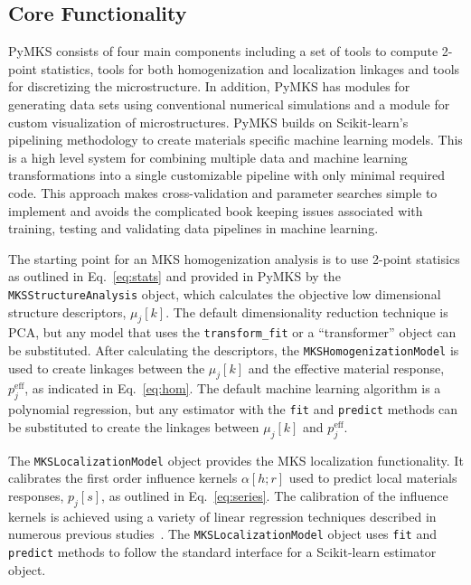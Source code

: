 \documentclass{bmcart}
\begin{document}
\subsection{Core Functionality}


PyMKS consists of four main components including a set of tools to
compute 2-point statistics, tools for both homogenization and
localization linkages and tools for discretizing the microstructure. In
addition, PyMKS has modules for generating data sets using
conventional numerical simulations and a module for custom
visualization of microstructures. PyMKS builds on Scikit-learn's
pipelining methodology to create materials specific machine learning
models. This is a high level system for combining
multiple data and machine learning transformations into a single
customizable pipeline with only minimal required code. This approach
makes cross-validation and parameter searches simple to implement and
avoids the complicated book keeping issues associated with training,
testing and validating data pipelines in machine learning.

The starting point for an MKS homogenization analysis is to use
2-point statisics as outlined in Eq.~\ref{eq:stats} and provided in
PyMKS by the \texttt{MKSStructureAnalysis} object, which calculates
the objective low dimensional structure descriptors, $\mu_j[k]$. The
default dimensionality reduction technique is PCA, but any model that
uses the \texttt{transform\_fit} or a ``transformer'' object can be
substituted. After calculating the descriptors, the
\texttt{MKSHomogenizationModel} is used to create linkages between the
$\mu_j[k]$ and the effective material response, $p_j^{\text{eff}}$, as
indicated in Eq.~\ref{eq:hom}. The default machine learning algorithm
is a polynomial regression, but any estimator with the \texttt{fit}
and \texttt{predict} methods can be substituted to create the linkages
between $\mu_j[k]$ and $p_j^{\text{eff}}$.

The \texttt{MKSLocalizationModel} object provides the MKS localization
functionality. It calibrates the first order influence kernels
$\alpha[h; r]$ used to predict local materials responses, $p_j[s]$, as
outlined in Eq.~\ref{eq:series}. The calibration of the influence
kernels is achieved using a variety of linear regression techniques
described in numerous previous studies~\cite{landi2010multi,
kalidindi2010novel, yabansu2014calibrated, brough2016microstructure}.
The \texttt{MKSLocalizationModel} object uses \texttt{fit} and
\texttt{predict} methods to follow the standard interface for a
Scikit-learn estimator object.
\end{document}
